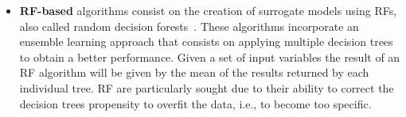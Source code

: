 \begin{itemize}
	\item \textbf{RF-based} algorithms consist on the creation of surrogate models using \acp{RF}, also called random decision forests~\cite{Ho1995RDF}. These algorithms incorporate an ensemble learning approach that consists on applying multiple decision trees to obtain a better performance. Given a set of input variables the result of an \ac{RF} algorithm will be given by the mean  of the results returned by each individual tree. \ac{RF} are particularly sought due to their ability to correct the decision trees propensity to overfit the data, i.e., to become too specific.
	
\end{itemize}
